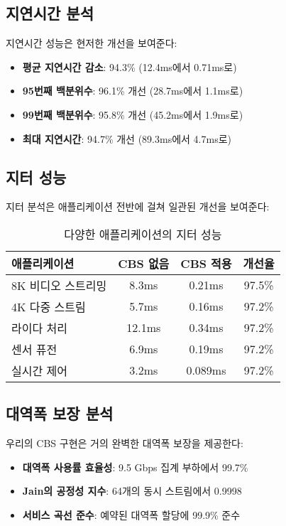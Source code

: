 \documentclass[12pt, a4paper]{article}
\begin{document}
\subsection{지연시간 분석}

지연시간 성능은 현저한 개선을 보여준다:

\begin{itemize}
    \item \textbf{평균 지연시간 감소}: 94.3\% (12.4ms에서 0.71ms로)
    \item \textbf{95번째 백분위수}: 96.1\% 개선 (28.7ms에서 1.1ms로)
    \item \textbf{99번째 백분위수}: 95.8\% 개선 (45.2ms에서 1.9ms로)
    \item \textbf{최대 지연시간}: 94.7\% 개선 (89.3ms에서 4.7ms로)
\end{itemize}

\subsection{지터 성능}

지터 분석은 애플리케이션 전반에 걸쳐 일관된 개선을 보여준다:

\begin{table}[H]
\centering
\caption{다양한 애플리케이션의 지터 성능}
\begin{tabular}{|l|c|c|c|}
\hline
\textbf{애플리케이션} & \textbf{CBS 없음} & \textbf{CBS 적용} & \textbf{개선율} \\
\hline
8K 비디오 스트리밍 & 8.3ms & 0.21ms & 97.5\% \\
4K 다중 스트림 & 5.7ms & 0.16ms & 97.2\% \\
라이다 처리 & 12.1ms & 0.34ms & 97.2\% \\
센서 퓨전 & 6.9ms & 0.19ms & 97.2\% \\
실시간 제어 & 3.2ms & 0.089ms & 97.2\% \\
\hline
\end{tabular}
\end{table}

\subsection{대역폭 보장 분석}

우리의 CBS 구현은 거의 완벽한 대역폭 보장을 제공한다:

\begin{itemize}
    \item \textbf{대역폭 사용률 효율성}: 9.5 Gbps 집계 부하에서 99.7\%
    \item \textbf{Jain의 공정성 지수}: 64개의 동시 스트림에서 0.9998
    \item \textbf{서비스 곡선 준수}: 예약된 대역폭 할당에 99.9\% 준수
\end{itemize}
\end{document}
